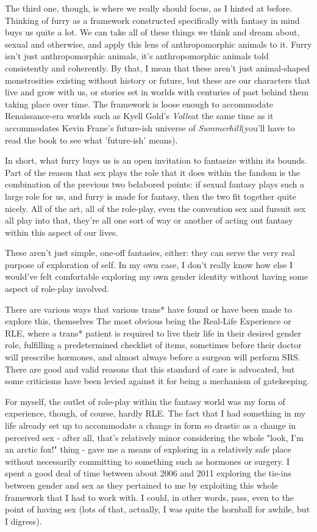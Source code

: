 The third one, though, is where we really should focus, as I hinted at before. Thinking of furry as a framework constructed specifically with fantasy in mind buys us quite a lot. We can take all of these things we think and dream about, sexual and otherwise, and apply this lens of anthropomorphic animals to it. Furry isn't just anthropomorphic animals, it's anthropomorphic animals told consistently and coherently. By that, I mean that these aren't just animal-shaped monstrosities existing without history or future, but these are our characters that live and grow with us, or stories set in worlds with centuries of past behind them taking place over time. The framework is loose enough to accommodate Renaissance-era worlds such as Kyell Gold's \emph{Volle}at the same time as it accommodates Kevin Frane's future-ish universe of \emph{Summerhill}(you'll have to read the book to see what 'future-ish' means).

In short, what furry buys us is an open invitation to fantasize within its bounds. Part of the reason that sex plays the role that it does within the fandom is the combination of the previous two belabored points: if sexual fantasy plays such a large role for us, and furry is made for fantasy, then the two fit together quite nicely. All of the art, all of the role-play, even the convention sex and fursuit sex all play into that, they're all one sort of way or another of acting out fantasy within this aspect of our lives.

These aren't just simple, one-off fantasies, either: they can serve the very real purpose of exploration of self. In my own case, I don't really know how else I would've felt comfortable exploring my own gender identity without having some aspect of role-play involved.

There are various ways that various trans* have found or have been made to explore this, themselves The most obvious being the Real-Life Experience or RLE, where a trans* patient is required to live their life in their desired gender role, fulfilling a predetermined checklist of items, sometimes before their doctor will prescribe hormones, and almost always before a surgeon will perform SRS. There are good and valid reasons that this standard of care is advocated, but some criticisms have been levied against it for being a mechanism of gatekeeping.

For myself, the outlet of role-play within the fantasy world was my form of experience, though, of course, hardly RLE. The fact that I had something in my life already set up to accommodate a change in form so drastic as a change in perceived sex - after all, that's relatively minor considering the whole "look, I'm an arctic fox!" thing - gave me a means of exploring in a relatively safe place without necessarily committing to something such as hormones or surgery. I spent a good deal of time between about 2006 and 2011 exploring the tie-ins between gender and sex as they pertained to me by exploiting this whole framework that I had to work with. I could, in other words, pass, even to the point of having sex (lots of that, actually, I was quite the hornball for awhile, but I digress).

